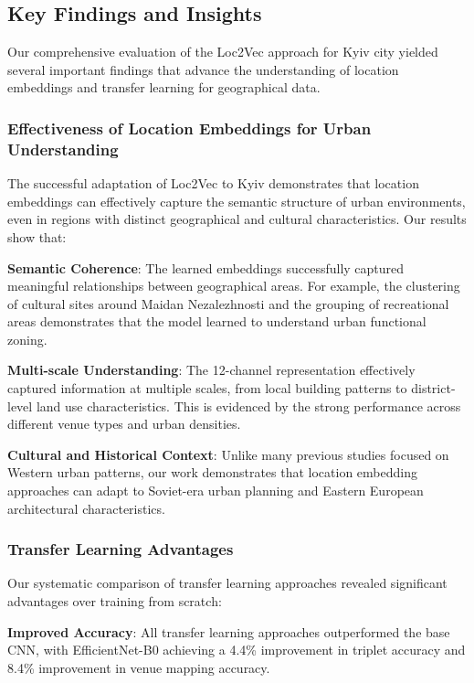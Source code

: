 \subsection{Key Findings and Insights}

Our comprehensive evaluation of the Loc2Vec approach for Kyiv city yielded several important findings that advance the understanding of location embeddings and transfer learning for geographical data.

\subsubsection{Effectiveness of Location Embeddings for Urban Understanding}

The successful adaptation of Loc2Vec to Kyiv demonstrates that location embeddings can effectively capture the semantic structure of urban environments, even in regions with distinct geographical and cultural characteristics. Our results show that:

\textbf{Semantic Coherence}: The learned embeddings successfully captured meaningful relationships between geographical areas. For example, the clustering of cultural sites around Maidan Nezalezhnosti and the grouping of recreational areas demonstrates that the model learned to understand urban functional zoning.

\textbf{Multi-scale Understanding}: The 12-channel representation effectively captured information at multiple scales, from local building patterns to district-level land use characteristics. This is evidenced by the strong performance across different venue types and urban densities.

\textbf{Cultural and Historical Context}: Unlike many previous studies focused on Western urban patterns, our work demonstrates that location embedding approaches can adapt to Soviet-era urban planning and Eastern European architectural characteristics.

\subsubsection{Transfer Learning Advantages}

Our systematic comparison of transfer learning approaches revealed significant advantages over training from scratch:

\textbf{Improved Accuracy}: All transfer learning approaches outperformed the base CNN, with EfficientNet-B0 achieving a 4.4\% improvement in triplet accuracy and 8.4\% improvement in venue mapping accuracy.

